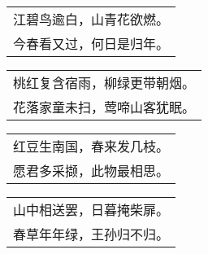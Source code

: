 \nopagebreak%
\nopagebreak%
\noindent\begin{minipage}{\linewidth}
  \vskip-3pt\begin{table}[H]
    \centering
    \begin{tabular}{@{}l@{}}
江碧鸟逾白，山青花欲燃。\\
今春看又过，何日是归年。
    \end{tabular}
  \end{table}
\end{minipage}
\vspace{1cm}


\nopagebreak%
\nopagebreak%
\noindent\begin{minipage}{\linewidth}
  \vskip-3pt\begin{table}[H]
    \centering
    \begin{tabular}{@{}l@{}}
桃红复含宿雨，柳绿更带朝烟。\\
花落家童未扫，莺啼山客犹眠。
    \end{tabular}
  \end{table}
\end{minipage}
\vspace{1cm}


\nopagebreak%
\nopagebreak%
\noindent\begin{minipage}{\linewidth}
  \vskip-3pt\begin{table}[H]
    \centering
    \begin{tabular}{@{}l@{}}
红豆生南国，春来发几枝。\\
愿君多采撷，此物最相思。
    \end{tabular}
  \end{table}
\end{minipage}
\vspace{1cm}


\nopagebreak%
\nopagebreak%
\noindent\begin{minipage}{\linewidth}
  \vskip-3pt\begin{table}[H]
    \centering
    \begin{tabular}{@{}l@{}}
山中相送罢，日暮掩柴扉。\\
春草年年绿，王孙归不归。
    \end{tabular}
  \end{table}
\end{minipage}
\vspace{1cm}


